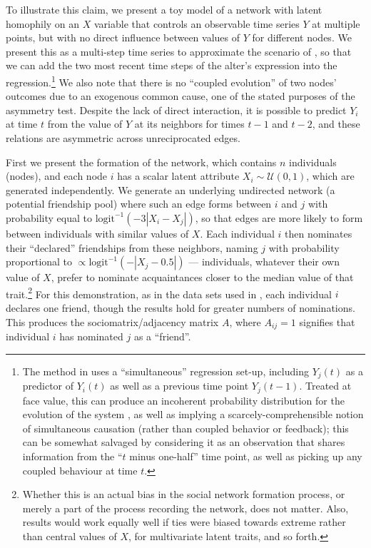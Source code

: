 \documentclass{article}
\begin{document}
\begin{multicols}{2}
To illustrate this claim, we present a toy model of a network with latent
homophily on an $X$ variable that controls an observable time series $Y$ at
multiple points, but with no direct influence between values of $Y$ for
different nodes. We present this as a multi-step time series to approximate the
scenario of \citet{Christakis-Fowler-spread-of-obesity}, so that we can add the
two most recent time steps of the alter's expression into the
regression.\footnote{The method in \citet{Christakis-Fowler-spread-of-obesity}
  uses a ``simultaneous'' regression set-up, including $Y_j(t)$ as a predictor
  of $Y_i(t)$ as well as a previous time point $Y_j(t-1)$.  Treated at face
  value, this can produce an incoherent probability distribution for the
  evolution of the system \citep{lyons2010semvfsa}, as well as implying a
  scarcely-comprehensible notion of simultaneous causation (rather than coupled
  behavior or feedback); this can be somewhat salvaged by considering it as an
  observation that shares information from the ``$t$ minus one-half'' time
  point, as well as picking up any coupled behaviour at time $t$.}  We also
note that there is no ``coupled evolution'' of two nodes' outcomes due to an
exogenous common cause, one of the stated purposes of the asymmetry
test. Despite the lack of direct interaction, it is possible to predict $Y_i$
at time $t$ from the value of $Y$ at its neighbors for times $t-1$ and $t-2$,
and these relations are asymmetric across unreciprocated edges.

First we present the formation of the network, which contains $n$ individuals
(nodes), and each node $i$ has a scalar latent attribute $X_i \sim
\mathcal{U}(0,1)$, which are generated independently. We generate an underlying
undirected network (a potential friendship pool) where such an edge forms
between $i$ and $j$ with probability equal to
$\mathrm{logit}^{-1}(-3|X_i-X_j|)$, so that edges are more likely to form
between individuals with similar values of $X$. Each individual $i$ then
nominates their ``declared'' friendships from these neighbors, naming $j$ with
probability proportional to $\propto \mathrm{logit}^{-1}(-|X_j - 0.5|)$ ---
individuals, whatever their own value of $X$, prefer to nominate acquaintances
closer to the median value of that trait.\footnote{Whether this is an actual
  bias in the social network formation process, or merely a part of the process
  recording the network, does not matter.  Also, results would work equally
  well if ties were biased towards extreme rather than central values of $X$,
  for multivariate latent traits, and so forth.}  For this demonstration, as in
the data sets used in
\citet{Christakis-Fowler-spread-of-obesity,Fowler-Christakis-happiness}, each
individual $i$ declares one friend, though the results hold for greater numbers
of nominations. This produces the sociomatrix/adjacency matrix $A$, where
$A_{ij}=1$ signifies that individual $i$ has nominated $j$ as a ``friend''.


\end{multicols}
\end{document}
